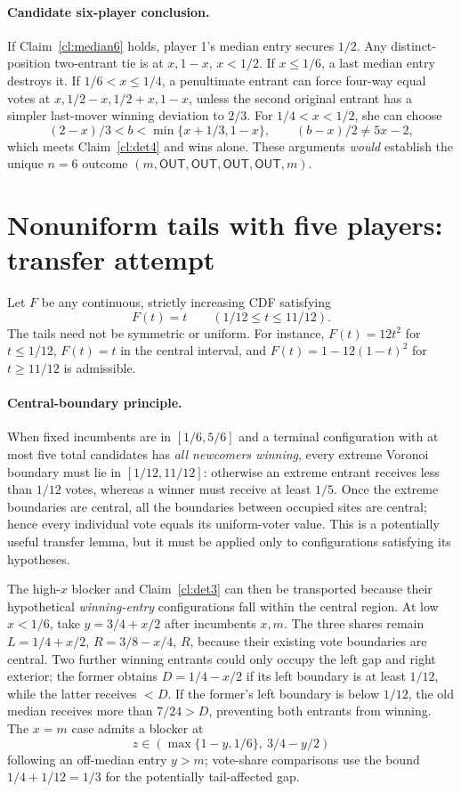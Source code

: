 \documentclass[10pt]{article}
\newcommand{\OUT}{\mathsf{OUT}}
\begin{document}
\paragraph{Candidate six-player conclusion.}
If Claim~\ref{cl:median6} holds, player 1's median entry secures $1/2$. Any distinct-position two-entrant tie is at $x,1-x$, $x<1/2$. If $x\le1/6$, a last median entry destroys it. If $1/6<x\le1/4$, a penultimate entrant can force four-way equal votes at $x,1/2-x,1/2+x,1-x$, unless the second original entrant has a simpler last-mover winning deviation to $2/3$. For $1/4<x<1/2$, she can choose
\[
 (2-x)/3<b<\min\{x+1/3,1-x\},\qquad (b-x)/2\ne5x-2,
\]
which meets Claim~\ref{cl:det4} and wins alone. These arguments \emph{would} establish the unique $n=6$ outcome $(m,\OUT,\OUT,\OUT,\OUT,m)$.

\section{Nonuniform tails with five players: transfer attempt}\label{sec:tails}
Let $F$ be any continuous, strictly increasing CDF satisfying
\[
 F(t)=t\qquad (1/12\le t\le11/12).
\tag{T}
\]
The tails need not be symmetric or uniform. For instance, $F(t)=12t^2$ for $t\le1/12$, $F(t)=t$ in the central interval, and $F(t)=1-12(1-t)^2$ for $t\ge11/12$ is admissible.

\paragraph{Central-boundary principle.}
When fixed incumbents are in $[1/6,5/6]$ and a terminal configuration with at most five total candidates has \emph{all newcomers winning}, every extreme Voronoi boundary must lie in $[1/12,11/12]$: otherwise an extreme entrant receives less than $1/12$ votes, whereas a winner must receive at least $1/5$. Once the extreme boundaries are central, all the boundaries between occupied sites are central; hence every individual vote equals its uniform-voter value. This is a potentially useful transfer lemma, but it must be applied only to configurations satisfying its hypotheses.

The high-$x$ blocker and Claim~\ref{cl:det3} can then be transported because their hypothetical \emph{winning-entry} configurations fall within the central region. At low $x<1/6$, take $y=3/4+x/2$ after incumbents $x,m$. The three shares remain $L=1/4+x/2$, $R=3/8-x/4$, $R$, because their existing vote boundaries are central. Two further winning entrants could only occupy the left gap and right exterior; the former obtains $D=1/4-x/2$ if its left boundary is at least $1/12$, while the latter receives $<D$. If the former's left boundary is below $1/12$, the old median receives more than $7/24>D$, preventing both entrants from winning. The $x=m$ case admits a blocker at
\[
 z\in\left(\max\{1-y,1/6\},\ 3/4-y/2\right)
\]
following an off-median entry $y>m$; vote-share comparisons use the bound $1/4+1/12=1/3$ for the potentially tail-affected gap.
\end{document}
